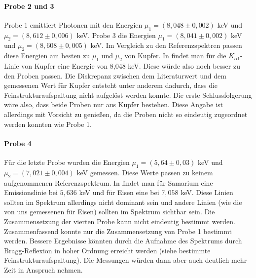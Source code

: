 \paragraph{Probe 2 und 3}  Probe 1 emittiert Photonen mit den Energien $\mu_1=(8,048 \pm 0,002)$ keV und $\mu_2= (8,612 \pm 0,006)$ keV. Probe 3 die Energien $\mu_1=(8,041 \pm 0,002)$ keV und $\mu_2=(8,608 \pm 0,005)$ keV. Im Vergleich zu den Referenzspektren passen diese Energien am besten zu $\mu_1$ und $\mu_2$ von Kupfer. In \cite{booklet} findet man für die $K_{\alpha 1}$-Linie von Kupfer eine Energie von 8,048 keV. Diese würde also noch besser zu den Proben passen. Die Diskrepanz zwischen dem Literaturwert und dem gemessenen Wert für Kupfer entsteht unter anderem dadurch, dass die Feinstrukturaufspaltung nicht aufgelöst werden konnte. Die erste Schlussfolgerung wäre also, dass beide Proben nur aus Kupfer bestehen. Diese Angabe ist allerdings mit Vorsicht zu genießen, da die Proben nicht so eindeutig zugeordnet werden konnten wie Probe 1.

\paragraph{Probe 4} Für die letzte Probe wurden die Energien $\mu_1=(5,64 \pm 0,03)$ keV und $\mu_2=(7,021 \pm 0,004)$ keV gemessen. Diese Werte passen zu keinem aufgenommenen Referenzspektrum. In \cite{booklet} findet man für Samarium eine Emissionslinie bei $5,636$ keV und für Eisen eine bei $7,058$ keV. Diese Linien sollten im Spektrum allerdings nicht dominant sein und andere Linien (wie die von uns gemessenen für Eisen) sollten im Spektrum sichtbar sein. Die Zusammensetzung der vierten Probe kann nicht eindeutig bestimmt werden. \\ 

Zusammenfassend konnte nur die Zusammensetzung von Probe 1 bestimmt werden. Bessere Ergebnisse könnten durch die Aufnahme des Spektrums durch Bragg-Reflexion in hoher Ordnung erreicht werden (siehe bestimmte Feinstrukturaufspaltung). Die Messungen würden dann aber auch deutlich mehr Zeit in Anspruch nehmen.

\newpage

